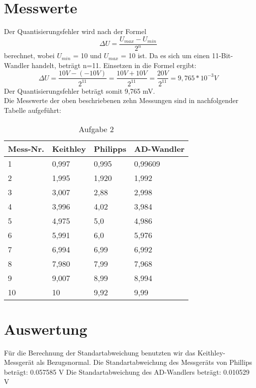 \section{Messwerte}
\label{chap:VERSUCH_2_MESSWERTE}
Der Quantisierungsfehler wird nach der Formel 
\begin{equation}
\Delta U = \frac{U_{max} - U_{min}}{2^n}
\end{equation}
berechnet, wobei $U_{min}$ = 10 und $U_{max}$ = 10 ist. Da es sich um einen 11-Bit-Wandler handelt, beträgt n=11. Einsetzen in die Formel ergibt:
\begin{equation}
\Delta U = \frac{10V - (-10V)}{2^{11}} = \frac{10V + 10V}{2^{11}} = \frac{20V}{2^{11}} = 9,765 *10^{-3}V
\end{equation}
Der Quantisierungsfehler beträgt somit 9,765 mV.\\
Die Messwerte der oben beschriebenen zehn Messungen sind in nachfolgender Tabelle aufgeführt:\\
\begin{table}[H]
\begin{center}
\begin{tabular}{|l|l|l|l|}
\hline
Mess-Nr. & Keithley & Philipps & AD-Wandler \\ \hline
1 & 0,997 & 0,995 & 0,99609 \\ \hline
2 & 1,995 & 1,920 & 1,992 \\ \hline
3 & 3,007 & 2,88 & 2,998 \\ \hline
4 & 3,996 & 4,02 & 3,984 \\ \hline
5 & 4,975 & 5,0 & 4,986 \\ \hline
6 & 5,991 & 6,0 & 5,976 \\ \hline
7 & 6,994 & 6,99 & 6,992 \\ \hline
8 & 7,980 & 7,99 & 7,968 \\ \hline
9 & 9,007 & 8,99 & 8,994 \\ \hline
10 & 10 & 9,92 & 9,99 \\ \hline
\end{tabular}
\caption{Aufgabe 2}
\end{center}
\end{table}

\section{Auswertung}
\label{chap:VERSUCH_2_AUSWERTUNG}
Für die Berechnung der Standartabweichung benutzten wir das Keithley-Messgerät als Bezugsnormal. 
Die Standartabweichung des Messgeräts von Phillips beträgt: 0.057585 V
Die Standartabweichung des AD-Wandlers beträgt: 0.010529 V


